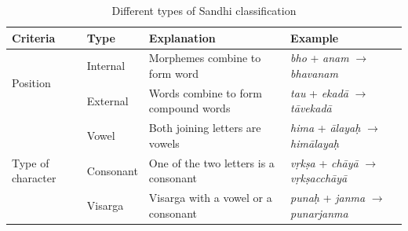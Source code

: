 \documentclass[11pt]{article}
\begin{document}
\begin{table}[t]
	\begin{center}
		\begin{tabular}{|p{1.2cm}|l|l|l|}
			\hline 
			\bf Criteria	& \bf Type	& \bf Explanation	& \bf Example \\
			\hline
			
			\multirow{2}{*}{Position} & Internal &  Morphemes combine to form word &\textit{ bho} + \textit{anam}  $\rightarrow$ \textit{bhavanam } \\ \cline{2-4} 
			
			& External & Words combine to form compound words & \textit{tau} + \textit{ekad\={a}} $\rightarrow$ \textit{t\={a}vekad\={a}}  \\ \hline \hline
			
			\multirow{3}{*}{\parbox{1.2cm}{Type of character}} & Vowel &  Both joining letters are vowels  & \textit{ hima} + \textit{ \={a}laya\d{h}} $\rightarrow$ \textit{him\={a}laya\d{h}}  \\ \cline{2-4} 
			
			& Consonant &  One of the two letters is a consonant & \textit{v\d{r}k\d{s}a} + \textit{ch\={a}y\={a} } $\rightarrow$ \textit{v\d{r}k\d{s}acch\={a}y\={a}} 
			\\ \cline{2-4}
			
			& Visarga &  Visarga with a vowel or a consonant &  \textit{ puna\d{h} } + \textit{janma } $\rightarrow$ \textit{punarjanma}    \\ \hline 
			
		\end{tabular}
	\end{center}
	\caption{\label{typestable} Different types of Sandhi classification}
\end{table}
\end{document}
